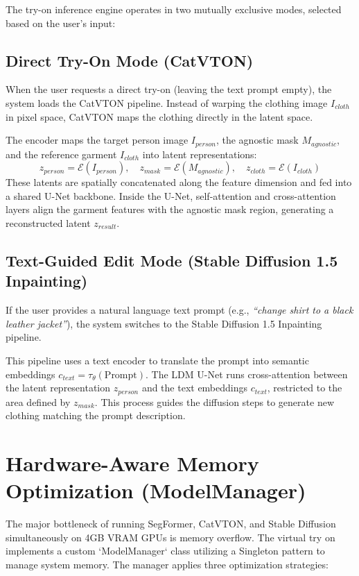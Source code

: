 \documentclass[12pt, a4paper]{report}
\begin{document}
The try-on inference engine operates in two mutually exclusive modes, selected based on the user's input:

\subsection{Direct Try-On Mode (CatVTON)}

When the user requests a direct try-on (leaving the text prompt empty), the system loads the CatVTON pipeline. Instead of warping the clothing image $I_{cloth}$ in pixel space, CatVTON maps the clothing directly in the latent space.

The encoder maps the target person image $I_{person}$, the agnostic mask $M_{agnostic}$, and the reference garment $I_{cloth}$ into latent representations:
\[
z_{person} = \mathcal{E}(I_{person}), \quad z_{mask} = \mathcal{E}(M_{agnostic}), \quad z_{cloth} = \mathcal{E}(I_{cloth})
\]
These latents are spatially concatenated along the feature dimension and fed into a shared U-Net backbone. Inside the U-Net, self-attention and cross-attention layers align the garment features with the agnostic mask region, generating a reconstructed latent $z_{result}$.

\subsection{Text-Guided Edit Mode (Stable Diffusion 1.5 Inpainting)}

If the user provides a natural language text prompt (e.g., \textit{``change shirt to a black leather jacket''}), the system switches to the Stable Diffusion 1.5 Inpainting pipeline.

This pipeline uses a text encoder to translate the prompt into semantic embeddings $c_{text} = \tau_{\theta}(\text{Prompt})$. The LDM U-Net runs cross-attention between the latent representation $z_{person}$ and the text embeddings $c_{text}$, restricted to the area defined by $z_{mask}$. This process guides the diffusion steps to generate new clothing matching the prompt description.

\section{Hardware-Aware Memory Optimization (ModelManager)}

The major bottleneck of running SegFormer, CatVTON, and Stable Diffusion simultaneously on 4GB VRAM GPUs is memory overflow. The virtual try on implements a custom `ModelManager` class utilizing a Singleton pattern to manage system memory. The manager applies three optimization strategies:
\end{document}
